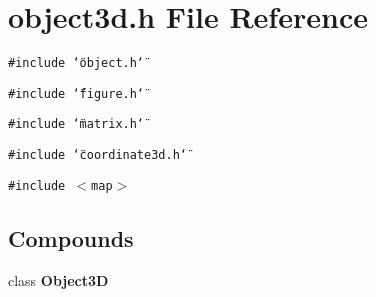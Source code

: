 \section{object3d.h File Reference}
\label{object3d_8h}
{\tt \#include \char`\"{}object.h\char`\"{}}\par
{\tt \#include \char`\"{}figure.h\char`\"{}}\par
{\tt \#include \char`\"{}matrix.h\char`\"{}}\par
{\tt \#include \char`\"{}coordinate3d.h\char`\"{}}\par
{\tt \#include $<$map$>$}\par
\subsection*{Compounds}
\begin{CompactItemize}
\item 
class {\bf Object3D}
\end{CompactItemize}
